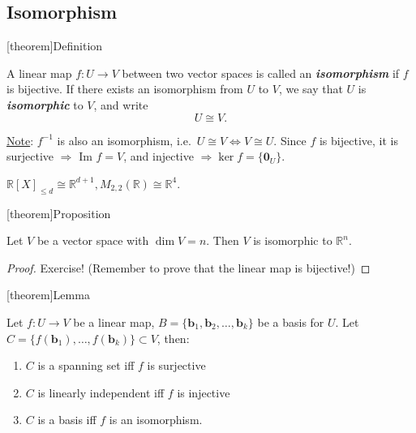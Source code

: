 \documentclass[12pt]{report}
\theoremstyle{definition}
\begin{document}
\subsection{Isomorphism}

[theorem]{Definition}
\begin{isomorphism}
    A linear map $f:U\rightarrow{}V$ between two vector spaces is called an \textbf{\emph{isomorphism}}
    if $f$ is bijective.
    If there exists an isomorphism from $U$ to $V$,
    we say that $U$ is \textbf{\emph{isomorphic}} to $V$, and write\[
        U \cong V.
    \]
\end{isomorphism}

\underline{Note}: $f^{-1}$ is also an isomorphism, i.e.\ $U \cong V \iff V \cong U$.
Since $f$ is bijective, it is surjective $\Rightarrow{}$ Im $f = V$,
and injective $\Rightarrow{} \ker{f} = \{\mathbf{0}_U\}$.

\begin{ex}
    $\mathbb{R}{[X]}_{\le d} \cong \mathbb{R}^{d+1}, M_{2, 2}(\mathbb{R}) \cong \mathbb{R}^{4}$.
\end{ex}

[theorem]{Proposition}
\begin{isomorphic to Rn}
    Let $V$ be a vector space with $\dim{V} = n$.
    Then $V$ is isomorphic to $\mathbb{R}^{n}$.
\end{isomorphic to Rn}

\begin{proof}
    Exercise! (Remember to prove that the linear map is bijective!)
\end{proof}

[theorem]{Lemma}
\begin{C is basis iif f is isomorphism}
    Let $f:U\rightarrow{}V$ be a linear map, $B=\{\mathbf{b}_1, \mathbf{b}_2,\ldots,\mathbf{b}_k\}$
    be a basis for $U$. Let $C = \{f(\mathbf{b}_1),\ldots,f(\mathbf{b}_k)\} \subset V$, then:
    \begin{enumerate}[label = (\roman*)]
        \item $C$ is a spanning set iff $f$ is surjective
        \item $C$ is linearly independent iff $f$ is injective
        \item $C$ is a basis iff $f$ is an isomorphism.
    \end{enumerate}
\end{C is basis iif f is isomorphism}
\end{document}
